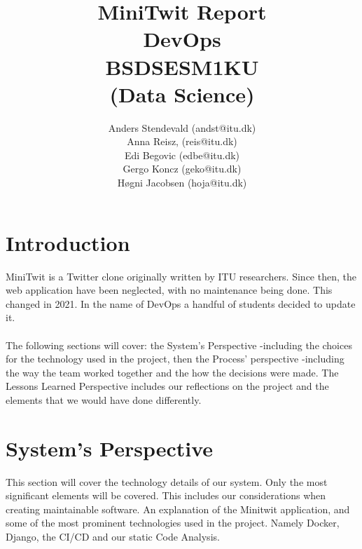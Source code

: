 \documentclass[12pt]{article}
\begin{document}
 
 
\title{MiniTwit Report \\
DevOps \\
BSDSESM1KU \\
(Data Science)}

\author{Anders Stendevald (andst@itu.dk) \\ 
Anna Reisz, (reis@itu.dk) \\ 
Edi Begovic (edbe@itu.dk) \\ 
Gergo Koncz (geko@itu.dk) \\ 
Høgni Jacobsen (hoja@itu.dk)\\
}

\maketitle
\clearpage
\section{Introduction}
MiniTwit is a Twitter clone originally written by ITU researchers. Since then, the web application have been neglected, with no maintenance being done. This changed in 2021. In the name of DevOps a handful of students decided to update it. 
\\\\
The following sections will cover: the System's Perspective -including the choices for the technology used in the project, then the Process' perspective -including the way the team worked together and the how the decisions were made. The Lessons Learned Perspective includes our reflections on the project and the elements that we would have done differently.

\section{System's Perspective}
This section will cover the technology details of our system. Only the most significant elements will be covered. This includes our considerations when creating maintainable software. An explanation of the Minitwit application, and some of the most prominent technologies used in the project. Namely Docker, Django, the CI/CD and our static Code Analysis.   
\end{document}
